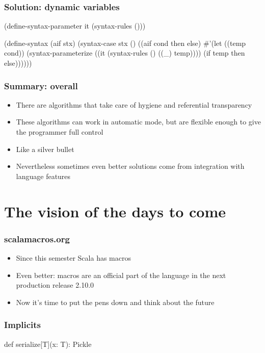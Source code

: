 \documentclass[hyperref={bookmarks=false}]{beamer}
\begin{document}
\begin{frame}[fragile]
\frametitle{Solution: dynamic variables}
\begin{semiverbatim}

\alert{(define-syntax-parameter it (syntax-rules ()))}

(define-syntax (aif stx)
  (syntax-case stx ()
    ((aif cond then else)
     #'(let ((temp cond))
         \alert{(syntax-parameterize}
         \alert{((it (syntax-rules () ((_) temp))))}
           (if temp then else))))))
\end{semiverbatim}
\end{frame}

\begin{frame}[fragile]
\frametitle{Summary: overall}
\begin{itemize}
\item There are algorithms that take care of hygiene and referential transparency
\item These algorithms can work in automatic mode, but are flexible enough to give the programmer full control
\item Like a silver bullet
\item Nevertheless sometimes even better solutions come from integration with language features
\end{itemize}
\end{frame}

\section{The vision of the days to come}

\begin{frame}[fragile]
\frametitle{scalamacros.org}
\begin{itemize}
\item Since this semester Scala has macros
\item Even better: macros are an official part of the language in the next production release 2.10.0
\item Now it's time to put the pens down and think about the future
\end{itemize}
\end{frame}

\begin{frame}[fragile]
\frametitle{Implicits}
\begin{semiverbatim}
def serialize[T](x: T): Pickle

\end{semiverbatim}
\end{frame}
\end{document}
